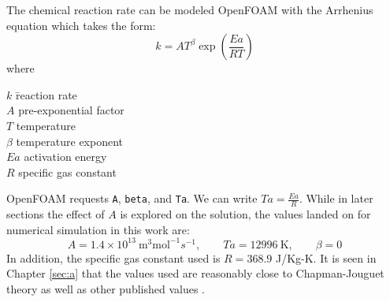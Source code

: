 The chemical reaction rate can be modeled OpenFOAM with the Arrhenius equation \cite{christ} which takes the form: 
\begin{equation}
k = AT^\beta \exp\left(\frac{Ea}{R T}\right)
\end{equation}
where 
\begin{tabbing}
\qquad \= \(k\) \qquad \= reaction rate \\ 
\> \(A\) \> pre-exponential factor \\
\> \(T\) \> temperature \\
\> \(\beta\) \> temperature exponent \\
\> \(Ea\) \> activation energy \\
\> \(R\) \> specific gas constant 
\end{tabbing}

\noindent OpenFOAM requests \verb|A|, \verb|beta|, and \verb|Ta|. We can write \(Ta = \frac{Ea}{R }\). While in later sections the effect of \(A\) is explored on the solution, the values landed on for numerical simulation in this work are:
\begin{equation}
   A = 1.4 \times 10^{13} ~ \text{m}^3\text{mol}^{-1}s^{-1},
   \qquad 
   Ta = 12996 ~\text{K},
   \qquad
   \beta = 0
\end{equation}
\noindent In addition, the specific gas constant used is \(R = 368.9\) J/Kg-K. It is seen in Chapter \ref{sec:a} that the values used are reasonably close to Chapman-Jouguet theory as well as other published values \cite{towery1}\cite{hashemi}. 





